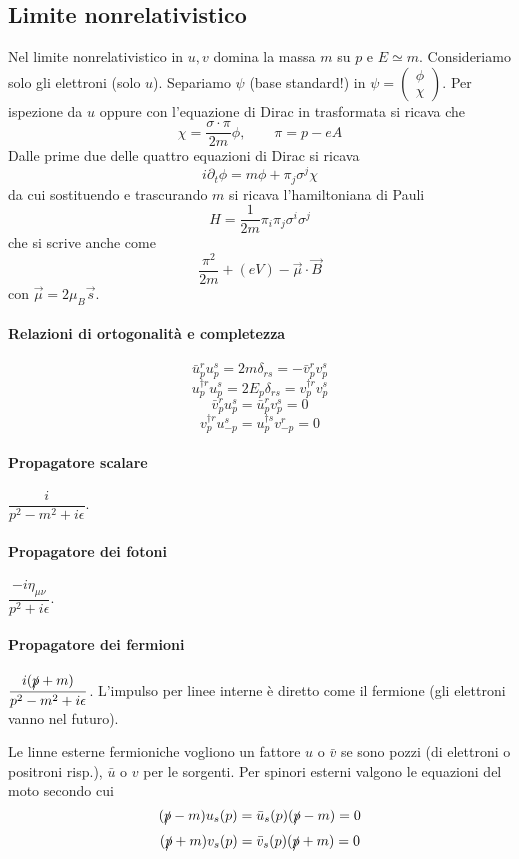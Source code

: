 \documentclass[12pt,a4paper]{article}
\begin{document}
	\subsection{Limite nonrelativistico}
	Nel limite nonrelativistico in $u,v$ domina la massa $m$ su $p$ e $E\simeq m$. Consideriamo solo gli elettroni (solo $u$). Separiamo $\psi$ (base standard!) in $\psi = \begin{pmatrix}	\phi\\ \chi \end{pmatrix}$. Per ispezione da $u$ oppure con l'equazione di Dirac in trasformata si ricava che 
	\[ \chi = \dfrac{\sigma\cdot \pi}{2m} \phi,\qquad \pi = p-eA \]
	Dalle prime due delle quattro equazioni di Dirac si ricava
	\[ i\partial_t \phi = m\phi + \pi_j \sigma^j \chi  \]
	da cui sostituendo e trascurando $m$ si ricava l'hamiltoniana di Pauli
	\[ H = \dfrac{1}{2m} \pi_i\pi_j \sigma^i\sigma^j \]
	che si scrive anche come
	\[ \dfrac{\pi^2}{2m} +(e V) - \vec{\mu}\cdot \vec{B} \]
	con $\vec{\mu} = 2 \mu_B \vec{s}$.
	
	\paragraph{Relazioni di ortogonalità e completezza}
	\[ \bar{u}_p^r u_p^s = 2m \delta_{rs} = - \bar{v}_p^r v_p^s \]
	\[ u_p^{\dagger r} u_p^s = 2E_p \delta_{rs} = v_p^{\dagger r} v_p^s \]
	\[ \bar{v}_p^r u_p^s = \bar{u}_p^r v_p^s = 0 \]
	\[ v_p^{\dagger r} u_{-p}^s = u_p^{\dagger s} v_{-p}^r = 0 \]
	
	\paragraph{Propagatore scalare} $\dfrac{i}{p^2-m^2+i\epsilon}$.
	\paragraph{Propagatore dei fotoni} $\dfrac{-i\eta_{\mu\nu}}{p^2+i\epsilon}$.
	\paragraph{Propagatore dei fermioni} $\dfrac{i(\slashed{p} + m)}{p^2-m^2 + i\epsilon}$. L'impulso per linee interne è diretto come il fermione (gli elettroni vanno nel futuro).
	
	Le linne esterne fermioniche vogliono un fattore $u$ o $\bar{v}$ se sono pozzi (di elettroni o positroni risp.), $\bar{u}$ o $v$ per le sorgenti. Per spinori esterni valgono le equazioni del moto secondo cui
	\[ (\slashed{p} - m)u_s(p) = \bar{u}_s(p) (\slashed{p} - m) = 0 \]
	\[ (\slashed{p} + m)v_s(p) = \bar{v}_s(p) (\slashed{p} + m) = 0 \]
	
\end{document}
